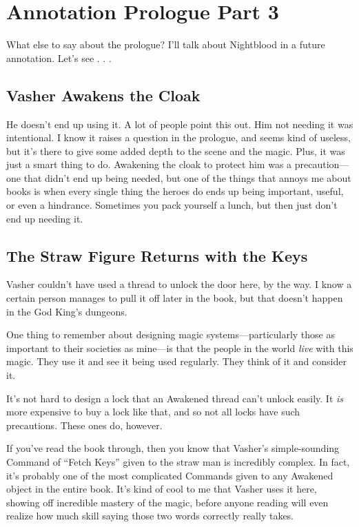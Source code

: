 \section{Annotation Prologue Part 3}

What else to say about the prologue? I’ll talk about Nightblood in a future annotation. Let’s see . . .

\subsection*{Vasher Awakens the Cloak}

He doesn’t end up using it. A lot of people point this out. Him not needing it was intentional. I know it raises a question in the prologue, and seems kind of useless, but it’s there to give some added depth to the scene and the magic. Plus, it was just a smart thing to do. Awakening the cloak to protect him was a precaution—one that didn’t end up being needed, but one of the things that annoys me about books is when every single thing the heroes do ends up being important, useful, or even a hindrance. Sometimes you pack yourself a lunch, but then just don’t end up needing it.

\subsection*{The Straw Figure Returns with the Keys}

Vasher couldn’t have used a thread to unlock the door here, by the way. I know a certain person manages to pull it off later in the book, but that doesn’t happen in the God King’s dungeons.

One thing to remember about designing magic systems—particularly those as important to their societies as mine—is that the people in the world \textit{live} with this magic. They use it and see it being used regularly. They think of it and consider it.

It’s not hard to design a lock that an Awakened thread can’t unlock easily. It \textit{is} more expensive to buy a lock like that, and so not all locks have such precautions. These ones do, however.

If you’ve read the book through, then you know that Vasher’s simple-sounding Command of “Fetch Keys” given to the straw man is incredibly complex. In fact, it’s probably one of the most complicated Commands given to any Awakened object in the entire book. It’s kind of cool to me that Vasher uses it here, showing off incredible mastery of the magic, before anyone reading will even realize how much skill saying those two words correctly really takes.

